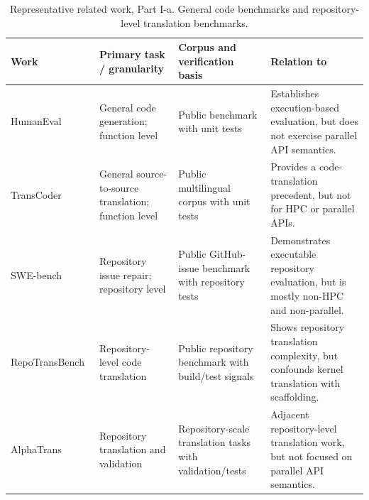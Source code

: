 \begin{table}[p]
\centering
\caption{
Representative related work, Part I-a. General code benchmarks and repository-level translation benchmarks.
}
\label{tab:related-work-a}
\scriptsize
\setlength{\tabcolsep}{3.2pt}
\renewcommand{\arraystretch}{1.05}
\begin{tabularx}{\textwidth}{@{}
>{\RaggedRight\arraybackslash}p{}
>{\RaggedRight\arraybackslash}p{}
>{\RaggedRight\arraybackslash}p{}
>{\RaggedRight\arraybackslash}X
@{}}
\toprule
Work & Primary task / granularity & Corpus and verification basis & Relation to \parbench{} \\
\midrule

HumanEval~\cite{HumanEval2021}
& General code generation; function level
& Public benchmark with unit tests
& Establishes execution-based evaluation, but does not exercise parallel API semantics. \\

TransCoder~\cite{TransCoder2020}
& General source-to-source translation; function level
& Public multilingual corpus with unit tests
& Provides a code-translation precedent, but not for HPC or parallel APIs. \\

SWE-bench~\cite{SWEbench2024}
& Repository issue repair; repository level
& Public GitHub-issue benchmark with repository tests
& Demonstrates executable repository evaluation, but is mostly non-HPC and non-parallel. \\

RepoTransBench~\cite{Wang2026RepoTransBench}
& Repository-level code translation
& Public repository benchmark with build/test signals
& Shows repository translation complexity, but confounds kernel translation with scaffolding. \\

AlphaTrans~\cite{AlphaTrans2025}
& Repository translation and validation
& Repository-scale translation tasks with validation/tests
& Adjacent repository-level translation work, but not focused on parallel API semantics. \\

\bottomrule
\end{tabularx}
\end{table}

